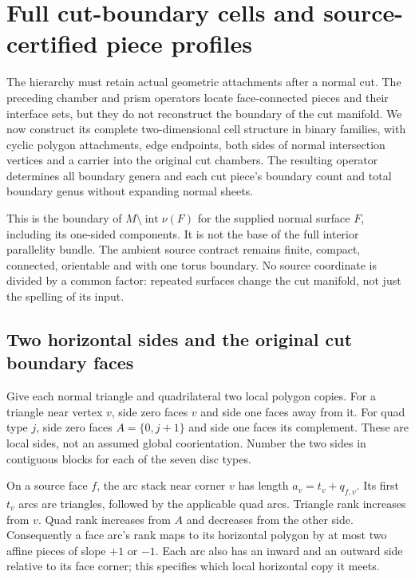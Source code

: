 \section{Full cut-boundary cells and source-certified piece profiles}
\label{sec:cut-boundary}

The hierarchy must retain actual geometric attachments after a normal cut.
The preceding chamber and prism operators locate face-connected pieces and
their interface sets, but they do not reconstruct the boundary of the cut
manifold. We now construct its complete two-dimensional cell structure in
binary families, with cyclic polygon attachments, edge endpoints, both sides
of normal intersection vertices and a carrier into the original cut chambers.
The resulting operator determines all boundary genera and each cut piece's
boundary count and total boundary genus without expanding normal sheets.

This is the boundary of $M\setminus\operatorname{int}\nu(F)$ for the supplied
normal surface $F$, including its one-sided components. It is not the base
of the full interior parallelity bundle. The ambient source contract remains
finite, compact, connected, orientable and with one torus boundary. No source
coordinate is divided by a common factor: repeated surfaces change the cut
manifold, not just the spelling of its input.

\subsection{Two horizontal sides and the original cut boundary faces}

Give each normal triangle and quadrilateral two local polygon copies. For a
triangle near vertex $v$, side zero faces $v$ and side one faces away from it.
For quad type $j$, side zero faces $A=\{0,j+1\}$ and side one faces its
complement. These are local sides, not an assumed global coorientation.
Number the two sides in contiguous blocks for each of the seven disc types.

On a source face $f$, the arc stack near corner $v$ has length
$a_v=t_v+q_{f,v}$. Its first $t_v$ arcs are triangles, followed by the
applicable quad arcs. Triangle rank increases from $v$. Quad rank increases
from $A$ and decreases from the other side. Consequently a face arc's rank
maps to its horizontal polygon by at most two affine pieces of slope $+1$
or $-1$. Each arc also has an inward and an outward side relative to its
face corner; this specifies which local horizontal copy it meets.

